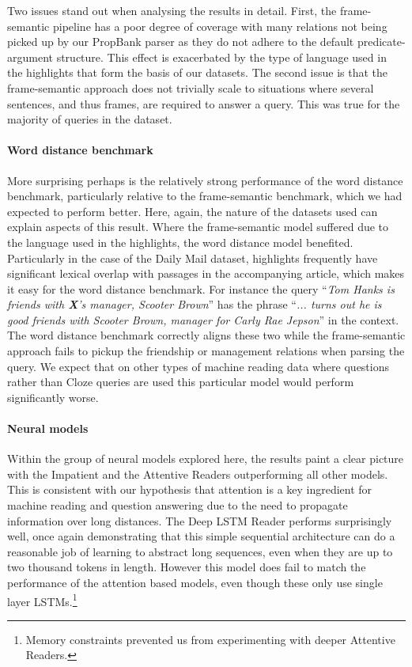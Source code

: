 \documentclass{article}
\begin{document}
Two issues stand out when analysing the results in detail. First, the
frame-semantic pipeline has a poor degree of coverage with many relations not
being picked up by our PropBank parser as they do not adhere to the default
predicate-argument structure. This effect is exacerbated by the type of language
used in the highlights that form the basis of our datasets.
The second issue is that the frame-semantic approach does not trivially scale to
situations where several sentences, and thus frames, are required to answer a
query. This was true for the majority of queries in the dataset.


\paragraph{Word distance benchmark}

More surprising perhaps is the relatively strong performance of the word
distance benchmark, particularly relative to the frame-semantic benchmark, which
we had expected to perform better. Here, again, the nature of the datasets used
can explain aspects of this result. Where the frame-semantic model suffered due
to the language used in the highlights, the word distance model benefited.
Particularly in the case of the Daily Mail dataset, highlights frequently have
significant lexical overlap with passages in the accompanying article,
which makes it easy for the word distance benchmark.
For instance the query ``\textit{Tom Hanks is friends with {\bf X}'s
manager, Scooter Brown}'' has the phrase ``\textit{... turns out he is good
friends with Scooter Brown, manager for Carly Rae Jepson}'' in the context. The
word distance benchmark correctly aligns these two while the frame-semantic
approach fails to pickup the friendship or management relations when parsing
the query.
We expect that on other types of machine reading data where questions rather
than Cloze queries are used this particular model would perform significantly
worse.


\paragraph{Neural models}

Within the group of neural models explored here, the results paint a clear
picture with the Impatient and the Attentive Readers outperforming all other
models. This is consistent with our hypothesis that attention is a key
ingredient for machine reading and question answering due to the need to
propagate information over long distances.  The Deep LSTM Reader
performs surprisingly well, once again demonstrating that this simple sequential
architecture can do a reasonable job of learning to abstract long sequences,
even when they are up to two thousand tokens in length.  However this model does
fail to match the performance of the attention based models, even though these
only use single layer LSTMs.\footnote{Memory constraints prevented us from
experimenting with deeper Attentive Readers.}
\end{document}

